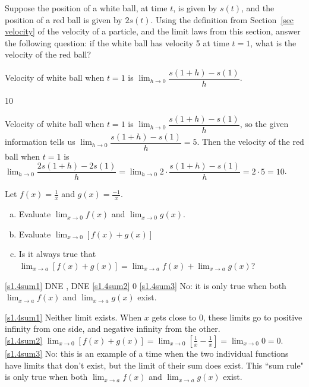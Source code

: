 \begin{question}Suppose the position of a white ball, at time $t$, is given by $s(t)$, and the position of a red ball is given by $2s(t)$. Using the definition from Section~\ref*{sec velocity} %
 of the velocity of a particle, and the limit laws from this section, answer the following question: if the white ball has velocity 5 at time $t=1$, what is the velocity of the red ball?
\end{question}
\begin{hint} Velocity of white ball when $t=1$ is $\displaystyle\lim_{h \rightarrow 0}\dfrac{s(1+h)-s(1)}{h}$.
\end{hint}
\begin{answer} 10
\end{answer}
\begin{solution} Velocity of white ball when $t=1$ is $\displaystyle\lim_{h \rightarrow 0}\dfrac{s(1+h)-s(1)}{h}$, so the given information tells us $\displaystyle\lim_{h \rightarrow 0}\dfrac{s(1+h)-s(1)}{h}=5$. Then the velocity of the red ball when $t=1$ is
$\displaystyle\lim_{h \rightarrow 0}\dfrac{2s(1+h)-2s(1)}{h}=
\displaystyle\lim_{h \rightarrow 0}2\cdot\dfrac{s(1+h)-s(1)}{h}=2\cdot 5 = 10$.
\end{solution}





\begin{Mquestion}Let $f(x) = \frac{1}{x}$ and $g(x) = \frac{-1}{x}$.
\begin{enumerate}[(a)]
\item\label{s1.4sum1} Evaluate $\displaystyle\lim_{x \rightarrow 0} f(x)$ and
$\displaystyle\lim_{x \rightarrow 0} g(x)$.
\item\label{s1.4sum2} Evaluate $\displaystyle\lim_{x \rightarrow 0} [f(x)+g(x)]$
\item\label{s1.4sum3} Is it always true that $\displaystyle\lim_{x \rightarrow a} [f(x)+g(x)]=
\displaystyle\lim_{x \rightarrow a} f(x)+\displaystyle\lim_{x \rightarrow a} g(x)$?
\end{enumerate}
\end{Mquestion}
\begin{answer}
\eqref{s1.4sum1} DNE , DNE\qquad
\eqref{s1.4sum2} 0 \qquad
\eqref{s1.4sum3} No: it is only true when both $\displaystyle\lim_{x \rightarrow a} f(x)$ and $\displaystyle\lim_{x \rightarrow a} g(x)$ exist.
\end{answer}
\begin{solution}
\eqref{s1.4sum1} Neither limit exists. When $x$ gets close to 0, these limits go to positive infinity from one side, and negative infinity from the other.\\
\eqref{s1.4sum2} $\displaystyle\lim_{x \rightarrow 0} [f(x)+g(x)]=
\displaystyle\lim_{x \rightarrow 0} \left[\frac{1}{x}-\frac{1}{x}\right]=
\displaystyle\lim_{x \rightarrow 0} 0=0$.\\
\eqref{s1.4sum3} No: this is an example of a time when the two individual functions have limits that don't exist, but the limit of their sum does exist.
This ``sum rule" is only true when both $\displaystyle\lim_{x \rightarrow a} f(x)$ and $\displaystyle\lim_{x \rightarrow a} g(x)$ exist.
\end{solution}

